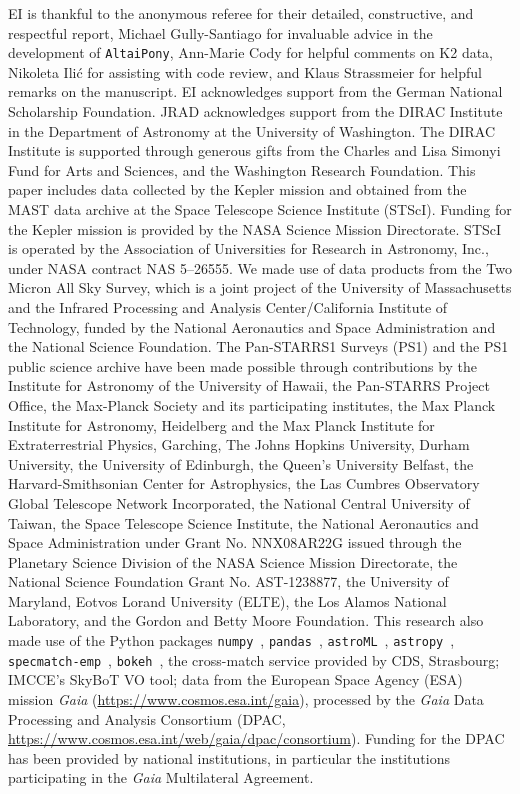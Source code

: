 \documentclass{aa}
\begin{document}
\begin{acknowledgements}
EI is thankful to the anonymous referee for their detailed, constructive, and respectful report, Michael Gully-Santiago for invaluable advice in the development of \texttt{AltaiPony}, Ann-Marie Cody for helpful comments on K2 data, Nikoleta Ilić for assisting with code review, and Klaus Strassmeier for helpful remarks on the manuscript. EI acknowledges support from the German National Scholarship Foundation. JRAD acknowledges support from the DIRAC Institute in the Department of Astronomy at the University of Washington. The DIRAC Institute is supported through generous gifts from the Charles and Lisa Simonyi Fund for Arts and Sciences, and the Washington Research Foundation.
This paper includes data collected by the Kepler mission and obtained from the MAST data archive at the Space Telescope Science Institute (STScI). Funding for the Kepler mission is provided by the NASA Science Mission Directorate. STScI is operated by the Association of Universities for Research in Astronomy, Inc., under NASA contract NAS 5–26555.
We made use of data products from the Two Micron All Sky Survey, which is a joint project of the University of Massachusetts and the Infrared Processing and Analysis Center/California Institute of Technology, funded by the National Aeronautics and Space Administration and the National Science Foundation. The Pan-STARRS1 Surveys (PS1) and the PS1 public science archive have been made possible through contributions by the Institute for Astronomy of the University of Hawaii, the Pan-STARRS Project Office, the Max-Planck Society and its participating institutes, the Max Planck Institute for Astronomy, Heidelberg and the Max Planck Institute for Extraterrestrial Physics, Garching, The Johns Hopkins University, Durham University, the University of Edinburgh, the Queen’s University Belfast, the Harvard-Smithsonian Center for Astrophysics, the Las Cumbres Observatory Global Telescope Network Incorporated, the National Central University of Taiwan, the Space Telescope Science Institute, the National Aeronautics and Space Administration under Grant No. NNX08AR22G issued through the Planetary Science Division of the NASA Science Mission Directorate, the National Science Foundation Grant No. AST-1238877, the University of Maryland, Eotvos Lorand University (ELTE), the Los Alamos National Laboratory, and the Gordon and Betty Moore Foundation.
This research also made use of the Python packages \texttt{numpy}~\citep{numpy2011}, \texttt{pandas}~\citep{pandas2010}, \texttt{astroML}~\citep{astroML2012, astroML2014}, \texttt{astropy}~\citep{astropy2013}, \texttt{specmatch-emp}~\citep{yee_specmatch_2017}, \texttt{bokeh}~\citep{bokeh}, the cross-match service provided by CDS, Strasbourg; IMCCE's SkyBoT VO tool; data from the European Space Agency (ESA) mission {\it Gaia} (\url{https://www.cosmos.esa.int/gaia}), processed by the {\it Gaia} Data Processing and Analysis Consortium (DPAC, \url{https://www.cosmos.esa.int/web/gaia/dpac/consortium}). Funding for the DPAC has been provided by national institutions, in particular the institutions participating in the {\it Gaia} Multilateral Agreement.
\end{acknowledgements}
\end{document}

